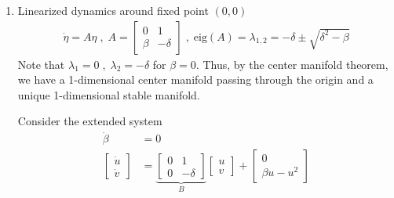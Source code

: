 \begin{solution}[4.3]
	\leavevmode
\begin{enumerate}
\item Linearized dynamics around fixed point $(0,0)$
\begin{align}
	\dot{\eta} = A\eta \; , \; A = \begin{bmatrix}
		0 & 1 \\ \beta & -\delta
	\end{bmatrix} \; , \; \text{eig}(A) = \lambda_{1,2} = -\delta \pm \sqrt{\delta^2 - \beta}
\end{align}
Note that $\lambda_1 = 0 \; , \; \lambda_2 = -\delta$ for $\beta = 0$. Thus, by the center manifold theorem, we have a 1-dimensional center manifold passing through the origin and a unique 1-dimensional stable manifold.

Consider the extended system
\begin{align}
	\dot{\beta} &= 0 \\
	\begin{bmatrix}
		\dot{u} \\ \dot{v}
	\end{bmatrix}
	&= \underbrace{\begin{bmatrix}
		0 & 1 \\ 0 & -\delta
	\end{bmatrix}}_{B} \begin{bmatrix}
		u \\ v
	\end{bmatrix}
	+
	\begin{bmatrix}
		0 \\ \beta u - u^2
	\end{bmatrix}
\end{align}


\end{enumerate}
\end{solution}
